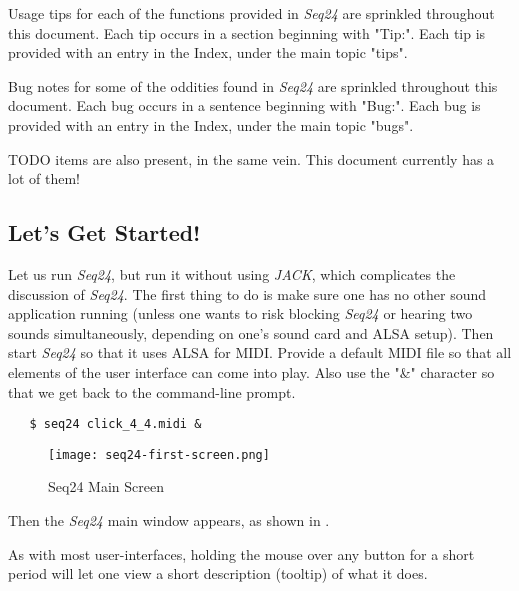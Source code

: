 \documentclass[
 11pt,
 twoside,
 a4paper,
 headinclude,
 footinclude,
 final                                 %
]{article}
\begin{document}
   Usage tips
   for each of the functions provided in
   \textsl{Seq24} are sprinkled throughout this document.
   Each tip occurs in a section beginning with "Tip:".
   Each tip is provided with an entry in the Index, under the
   main topic "tips".

   Bug notes
   for some of the oddities found in \textsl{Seq24} are
   sprinkled throughout this document.
   Each bug occurs in a sentence beginning with "Bug:".
   Each bug is provided with an entry in the Index, under the
   main topic "bugs".

   TODO items
   are also present, in the same vein.
   This document currently has a lot of them!

\subsection{Let's Get Started!}
\label{subsec:introduction_lets_get_started}

   Let us run \textsl{Seq24}, but run it without using \textsl{JACK}, which
   complicates the discussion of \textsl{Seq24}.  The first
   thing to do is make sure one has no other sound application running
   (unless one wants to risk blocking \textsl{Seq24} or hearing two sounds
   simultaneously, depending on one's sound card and ALSA setup).
   Then start \textsl{Seq24} so that it uses ALSA for
   MIDI.  Provide a default MIDI file so that all elements of the user
   interface can come into play.
   Also use the "\&" character so that we get back to the
   command-line prompt.

\begin{verbatim}
   $ seq24 click_4_4.midi &
\end{verbatim}

\begin{figure}[H]
   \centering 
   \texttt{[image: seq24-first-screen.png]}
   \caption{Seq24 Main Screen}
   \label{fig:seq24_main_screen}
\end{figure}

   
   Then the \textsl{Seq24} main window appears, as shown in
   .

   As with most user-interfaces, holding the mouse over any button for a
   short period will let one view a short description (tooltip)
   of what it does.
\end{document}
